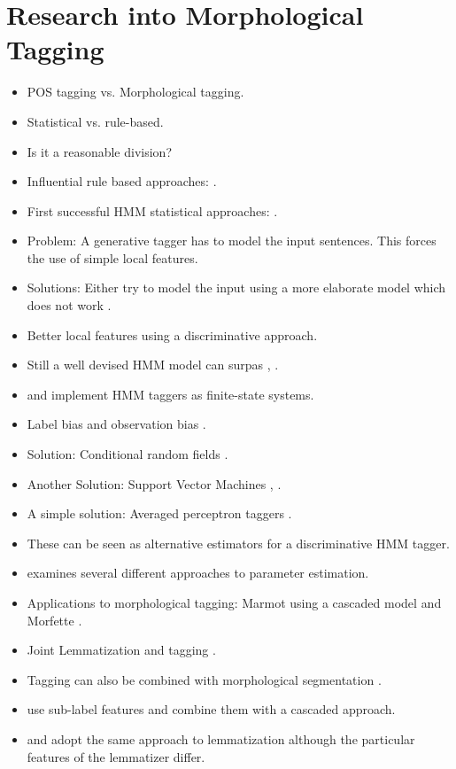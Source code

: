 \section{Research into Morphological Tagging}
\begin{itemize}
\item POS tagging vs. Morphological tagging.
\item Statistical vs. rule-based.
\item Is it a reasonable division?
\item Influential rule based approaches: \cite{Brill1992}
  \cite{Karlsson1995}.
\item First successful HMM statistical approaches: \cite{Church1988}
  \cite{DeRose1988}.
\item Problem: A generative tagger has to model the input
  sentences. This forces the use of simple local features.
\item Solutions: Either try to model the input using a more elaborate
  model which does not work \cite{Ruokolainen2013}.
\item Better local features using a discriminative
  approach\cite{Ratnaparkhi1997}.
\item Still a well devised HMM model can surpas \cite{Brants2000},
  \cite{Halacsy2007}.
\item \cite{Silfverberg2010} and \cite{Silfverberg2010} implement HMM
  taggers as finite-state systems.
\item Label bias \cite{Lafferty2001} and observation bias \cite{Klein2002}.
\item Solution: Conditional random fields \cite{Lafferty2001}.
\item Another Solution: Support Vector Machines \cite{Cortes1995},
  \cite{Gimenez2004}.
\item A simple solution: Averaged perceptron taggers \cite{Collins2002}.
\item These can be seen as alternative estimators for a discriminative
  HMM tagger.
\item \cite{Ruokolainen2014} examines several different approaches to
  parameter estimation.
\item Applications to morphological tagging: Marmot using a cascaded
  model \cite{Muller2013} and Morfette \cite{Chrupala2008}.
\item Joint Lemmatization and tagging \cite{Muller2015}.
\item Tagging can also be combined with morphological segmentation
  \cite{MullerX}.
\item \cite{Silfverberg2014} use sub-label features and
  \cite{Silfverberg2015} combine them with a cascaded approach.
\item \cite{Chrupala2008} and \cite{Silfverberg2015} adopt the same
  approach to lemmatization although the particular features of the
  lemmatizer differ.
\end{itemize}